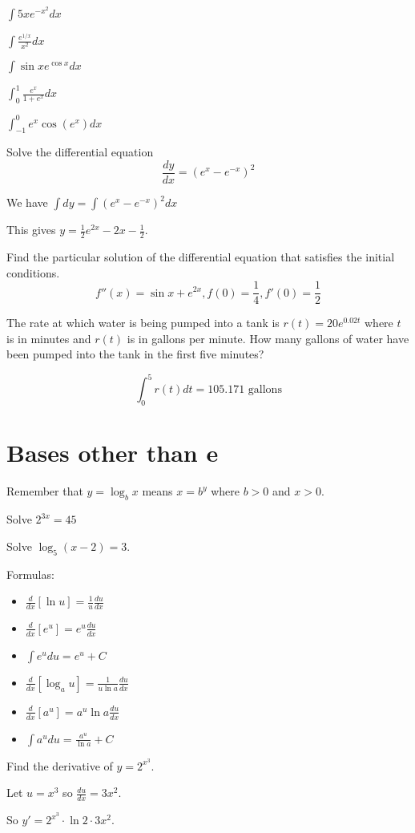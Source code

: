 \documentclass[../bccalc.tex]{subfiles}
\begin{document}
\ex $\int 5xe^{-x^2}dx$

\ex $\int \frac{e^{1/x}}{x^2}dx$

\ex $\int \sin xe^{\cos x}dx$

\ex $\int_0^1 \frac{e^x}{1+e^x}dx$

\ex $\int_{-1}^0 e^x\cos (e^x)dx$

\pagebreak
\begin{example}
    Solve the differential equation
    \[ \frac{dy}{dx}=(e^x-e^{-x})^2 \]

    We have $\int dy = \int(e^x-e^{-x})^2 dx$

    This gives $y=\frac{1}{2}e^{2x}-2x-\frac{1}{2}$.
\end{example}

\ex Find the particular solution of the differential equation that satisfies the initial conditions.
\[ f''(x)=\sin x+e^{2x}, f(0)=\frac{1}{4}, f'(0)=\frac{1}{2} \]

\begin{example}
    The rate at which water is being pumped into a tank is $r(t)=20e^{0.02t}$ where $t$ is in minutes and $r(t)$ is in gallons per minute. How many gallons of water have been pumped into the tank in the first five minutes?
    
    \[ \int_0^5 r(t)dt = 105.171 \text{ gallons} \]
\end{example}

\section{Bases other than e}
Remember that $y=\log_b x$ means $x=b^y$ where $b>0$ and $x>0$.

\ex Solve $2^{3x}=45$

\ex Solve $\log_5 (x-2)=3$.

Formulas:
\begin{itemize}
    \item $\frac{d}{dx}[\ln u]=\frac{1}{u}\frac{du}{dx}$
    \item $\frac{d}{dx}[e^u]=e^u \frac{du}{dx}$
    \item $\int e^u du = e^u + C$
    \item $\frac{d}{dx}[\log_a u]=\frac{1}{u\ln a}\frac{du}{dx}$
    \item $\frac{d}{dx}[a^u]=a^u\ln a \frac{du}{dx}$
    \item $\int a^u du = \frac{a^u}{\ln a}+C$
\end{itemize}

\begin{example}
    Find the derivative of $y=2^{x^3}$.

    Let $u=x^3$ so $\frac{du}{dx}=3x^2$.

    So $y'=2^{x^3}\cdot \ln 2\cdot 3x^2$.
\end{example}
\end{document}
